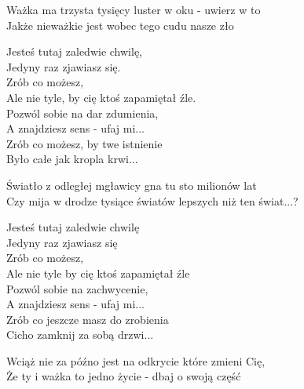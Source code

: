 \begin{text}
    Ważka ma trzysta tysięcy luster w oku - uwierz w to\\
    Jakże nieważkie jest wobec tego cudu nasze zło

    Jesteś tutaj zaledwie chwilę,\\
    Jedyny raz zjawiasz się.\\
    Zrób co możesz,\\
    Ale nie tyle, by cię ktoś zapamiętał źle.\\
    Pozwól sobie na dar zdumienia,\\
    A znajdziesz sens - ufaj mi...\\
    Zrób co możesz, by twe istnienie\\
    Było całe jak kropla krwi...

    Światło z odległej mgławicy gna tu sto milionów lat\\
    Czy mija w drodze tysiące światów lepszych niż ten świat...?

    Jesteś tutaj zaledwie chwilę\\
    Jedyny raz zjawiasz się\\
    Zrób co możesz,\\
    Ale nie tyle by cię ktoś zapamiętał źle\\
    Pozwól sobie na zachwycenie,\\
    A znajdziesz sens - ufaj mi...\\
    Zrób co jeszcze masz do zrobienia\\
    Cicho zamknij za sobą drzwi...

    Wciąż nie za późno jest na odkrycie które zmieni Cię,\\
    Że ty i ważka to jedno życie - dbaj o swoją część

\end{text}
\begin{chord}

\end{chord}
